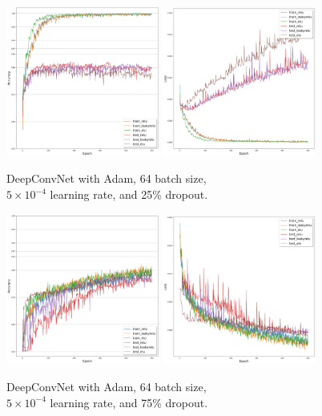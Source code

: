 	\begin{figure}[H]
		\centering
		\includegraphics[width=0.45\textwidth]{results/deepconvnet_adam_64_0.0005_0.25_acc.png}
		\includegraphics[width=0.45\textwidth]{results/deepconvnet_adam_64_0.0005_0.25_loss.png}
		\caption{DeepConvNet with Adam, 64 batch size, \\ $5 \times 10^{-4}$ learning rate, and 25\% dropout.}
	\end{figure}
	\begin{figure}[H]
		\centering
		\includegraphics[width=0.45\textwidth]{results/deepconvnet_adam_64_0.0005_0.75_acc.png}
		\includegraphics[width=0.45\textwidth]{results/deepconvnet_adam_64_0.0005_0.75_loss.png}
		\caption{DeepConvNet with Adam, 64 batch size, \\ $5 \times 10^{-4}$ learning rate, and 75\% dropout.}
	\end{figure}
